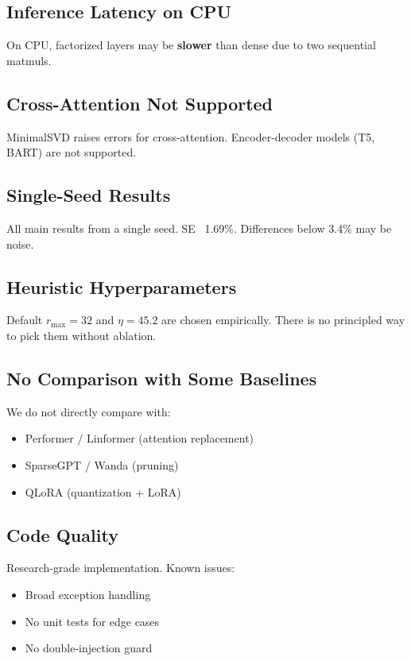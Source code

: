 \subsection{Inference Latency on CPU}

On CPU, factorized layers may be \textbf{slower} than dense due to two sequential 
matmuls.

\subsection{Cross-Attention Not Supported}

MinimalSVD raises errors for cross-attention. Encoder-decoder models (T5, 
BART) are not supported.

\subsection{Single-Seed Results}

All main results from a single seed. SE ~1.69\%. Differences below 3.4\% may 
be noise.

\subsection{Heuristic Hyperparameters}

Default $r_\text{max} = 32$ and $\eta = 45.2$ are chosen 
empirically. There is no principled way to pick them without ablation.

\subsection{No Comparison with Some Baselines}

We do not directly compare with:
\begin{itemize}
\item Performer / Linformer (attention replacement)
\item SparseGPT / Wanda (pruning)
\item QLoRA (quantization + LoRA)

\end{itemize}
\subsection{Code Quality}

Research-grade implementation. Known issues:
\begin{itemize}
\item Broad exception handling
\item No unit tests for edge cases
\item No double-injection guard

\end{itemize}
